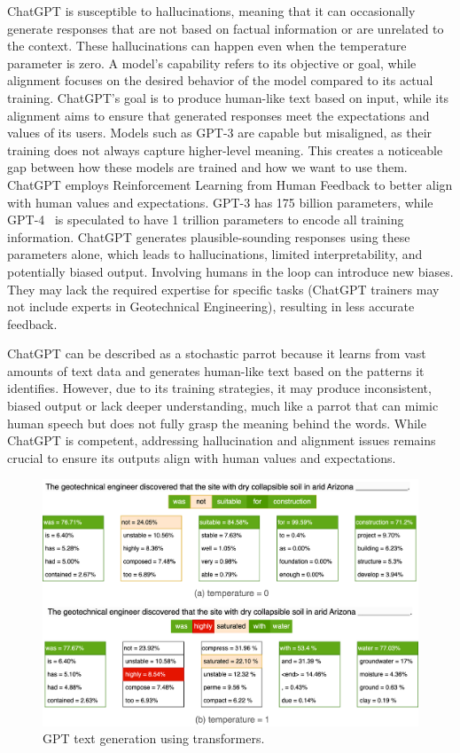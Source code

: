 \documentclass{article}
\begin{document}
ChatGPT is susceptible to hallucinations, meaning that it can occasionally generate responses that are not based on factual information or are unrelated to the context. These hallucinations can happen even when the temperature parameter is zero. A model's capability refers to its objective or goal, while alignment focuses on the desired behavior of the model compared to its actual training. ChatGPT's goal is to produce human-like text based on input, while its alignment aims to ensure that generated responses meet the expectations and values of its users. Models such as GPT-3 are capable but misaligned, as their training does not always capture higher-level meaning. This creates a noticeable gap between how these models are trained and how we want to use them. ChatGPT employs Reinforcement Learning from Human Feedback to better align with human values and expectations. GPT-3 has 175 billion parameters, while GPT-4~\citep{bubeck2023sparks} is speculated to have 1 trillion parameters to encode all training information. ChatGPT generates plausible-sounding responses using these parameters alone, which leads to hallucinations, limited interpretability, and potentially biased output. Involving humans in the loop can introduce new biases. They may lack the required expertise for specific tasks (ChatGPT trainers may not include experts in Geotechnical Engineering), resulting in less accurate feedback.

ChatGPT can be described as a stochastic parrot because it learns from vast amounts of text data and generates human-like text based on the patterns it identifies. However, due to its training strategies, it may produce inconsistent, biased output or lack deeper understanding, much like a parrot that can mimic human speech but does not fully grasp the meaning behind the words. While ChatGPT is competent, addressing hallucination and alignment issues remains crucial to ensure its outputs align with human values and expectations.

\begin{figure}[ht]
    \centering
    \includegraphics[width = 0.8\linewidth]{figs/transformers.png}
    \caption{GPT text generation using transformers.}
    \label{fig:transformers}
\end{figure}
\end{document}

